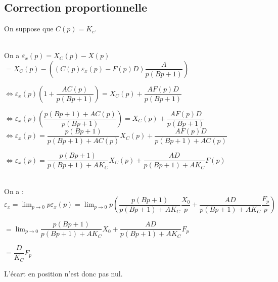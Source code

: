 
\fi
\subsection*{Correction proportionnelle}

On suppose que $C(p)=K_c$. 


\ifprof
\begin{corrige}~\\
On a $\varepsilon_x(p)=X_C(p)-X(p)$ 
$ =X_C(p)-\left(\left(C(p)\varepsilon_x(p)-F(p)D \right)\dfrac{A}{p\left(Bp+1 \right)}  \right) $

$\Leftrightarrow \varepsilon_x(p) \left(1+ \dfrac{AC(p)}{p\left(Bp+1 \right)}\right)=X_C(p)+\dfrac{AF(p)D }{p\left(Bp+1 \right)}   $

$\Leftrightarrow \varepsilon_x(p) \left( \dfrac{p\left(Bp+1 \right)+AC(p)}{p\left(Bp+1 \right)}\right)=X_C(p)+\dfrac{AF(p)D }{p\left(Bp+1 \right)}   $
$\Leftrightarrow \varepsilon_x(p) =\dfrac{p\left(Bp+1 \right)}{p\left(Bp+1 \right)+AC(p)}X_C(p)+\dfrac{AF(p)D }{p\left(Bp+1 \right)+AC(p)}  $

$\Leftrightarrow \varepsilon_x(p) =\dfrac{p\left(Bp+1 \right)}{p\left(Bp+1 \right)+AK_C}X_C(p)+\dfrac{AD }{p\left(Bp+1 \right)+AK_C} F(p) $
\end{corrige}
\else
\fi



\ifprof
\begin{corrige}~\\

On a : 
$\varepsilon_x = \lim_{p\to 0} p\varepsilon_x(p) = \lim_{p\to 0} p\left(\dfrac{p\left(Bp+1 \right)}{p\left(Bp+1 \right)+AK_C}\dfrac{X_0}{p}+\dfrac{AD }{p\left(Bp+1 \right)+AK_C} \dfrac{F_p}{p}\right) $

$= \lim_{p\to 0} \dfrac{p\left(Bp+1 \right)}{p\left(Bp+1 \right)+AK_C}{X_0}+\dfrac{AD }{p\left(Bp+1 \right)+AK_C} {F_p} $

$= \dfrac{D }{K_C} {F_p} $

L'écart en position n'est donc pas nul.
\end{corrige}
\else
\fi

